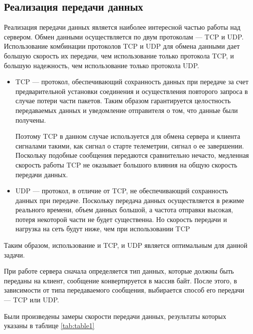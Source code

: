 \documentclass[conference]{IEEEtran}
\begin{document}
\subsection{Реализация передачи данных}
Реализация передачи данных является наиболее интересной частью работы над сервером. Обмен данными осуществляется по двум протоколам --- TCP и UDP. Использование комбинации протоколов TCP и UDP для обмена данными дает большую скорость их передачи, чем использование только протокола TCP, и большую надежность, чем использование только протокола UDP.
\begin{itemize}
\item TCP --- протокол, обеспечивающий сохранность данных при передаче за счет предварительной установки соединения и осуществления повторого запроса в случае потери части пакетов. Таким образом гарантируется целостность передаваемых данных и уведомление отправителя о том, что данные были получены.


Поэтому TCP в данном случае используется для обмена сервера и клиента сигналами такими, как сигнал о старте телеметрии, сигнал о ее завершении. Поскольку подобные сообщения передаются сравнительно нечасто, медленная скорость работы TCP не оказывает большого влияния на общую скорость передачи данных.
\item UDP --- протокол, в отличие от TCP, не обеспечивающий сохранность данных при передаче. Поскольку передача данных осуществляется в режиме реального времени, объем данных большой, а частота отправки высокая, потеря некоторой части не будет существенна. Но скорость передачи и нагрузка на сеть будут ниже, чем при использовании TCP 
\end{itemize}
Таким образом, использование и TCP, и UDP является оптимальным для данной задачи.

При работе сервера сначала определяется тип данных, которые должны быть переданы на клиент, сообщение конвертируется в массив байт. После этого, в зависимости от типа передаваемого сообщения, выбирается способ его передачи --- TCP или UDP.


Были произведены замеры скорости передачи данных, результаты которых указаны в таблице \ref{tab:table1}
\end{document}

